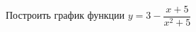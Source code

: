\begin{ex}
	\begin{condition}
		Построить график функции \( y=3-\dfrac{x+5}{x^2+5} \)
	\end{condition}
\end{ex}